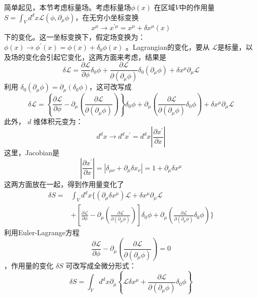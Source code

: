 简单起见，本节考虑标量场。考虑标量场$ \phi(x)$ 在区域$ V $中的作用量 $S=\int_{V} d^{d} x \mathcal{L}\left(\phi, \partial_{\mu} \phi\right) $，在无穷小坐标变换
\begin{equation}
	x^{\mu} \rightarrow x^{\prime \mu}=x^{\mu}+\delta x^{\mu}(x)
\end{equation}
下的变化。这一坐标变换下，假定场变换为：$ \phi(x) \rightarrow \phi^{\prime}(x)=\phi(x)+\delta_0 \phi(x)$ 。Lagrangian的变化，要从 $\mathcal{L} $是标量，以及场的变化会引起它变化，这两方面来考虑，结果是
\begin{equation}
		\delta \mathcal{L}=\frac{\partial \mathcal{L}}{\partial \phi} \delta_{0} \phi+\frac{\partial \mathcal{L}}{\partial\left(\partial_{\mu} \phi\right)} \delta_{0}\left(\partial_{\mu} \phi\right)+\delta x^{\mu} \partial_{\mu} \mathcal{L}
\end{equation}
利用 $\delta_0(\partial_\mu \phi)=\partial_\mu(\delta_0 \phi) $，这可改写成
\begin{equation}
	\delta \mathcal{L}=\left\{\frac{\partial \mathcal{L}}{\partial \phi}-\partial_{\mu}\left(\frac{\partial \mathcal{L}}{\partial\left(\partial_{\mu} \phi\right)}\right)\right\} \delta_{0} \phi+\partial_{\mu}\left(\frac{\partial \mathcal{L}}{\partial\left(\partial_{\mu} \phi\right)} \delta_{0} \phi\right)+\delta x^{\mu} \partial_{\mu} \mathcal{L}
\end{equation}
此外， $d$ 维体积元变为：
\begin{equation}
	d^{d} x \rightarrow d^{d} x^{\prime}=d^{d} x\left|\frac{\partial x^{\prime}}{\partial x}\right|
\end{equation}
这里，Jacobian是
\begin{equation}
	\left|\frac{\partial x^{\prime}}{\partial x}\right|=\left|\delta_{\mu \nu}+\partial_{\mu} \delta x_{\nu}\right|=1+\partial_{\mu} \delta x^{\mu}
\end{equation}
这两方面放在一起，得到作用量变化了
\begin{equation}
	\begin{aligned} \delta S=&\int_{V} d^{d} x\Bigg\{(\partial_{\mu} \delta x^{\mu}) \mathcal{L}+\delta x^{\mu} \partial_{\mu} \mathcal{L} \\&+\left[\frac{\partial \mathcal{L}}{\partial \phi}-\partial_{\mu}\left(\frac{\partial \mathcal{L}}{\partial\left(\partial_{\mu} \phi\right)}\right)\right] \delta_{0} \phi+\partial_{\mu}\left(\frac{\partial \mathcal{L}}{\partial\left(\partial_{\mu} \phi\right)} \delta_{0} \phi\right)\Bigg\}\end{aligned}
\end{equation}
利用Euler-Lagrange方程
\begin{equation}
	\frac{\partial \mathcal{L}}{\partial \phi}-\partial_{\mu}\left(\frac{\partial \mathcal{L}}{\partial\left(\partial_{\mu} \phi\right)}\right)=0
\end{equation}
，作用量的变化 $\delta S$ 可改写成全微分形式：
\begin{equation}
	\delta S=\int_{V} d^{d} x \partial_{\mu}\left\{\mathcal{L} \delta x^{\mu}+\frac{\partial \mathcal{L}}{\partial\left(\partial_{\mu} \phi\right)} \delta_{0} \phi\right\}
\end{equation}

